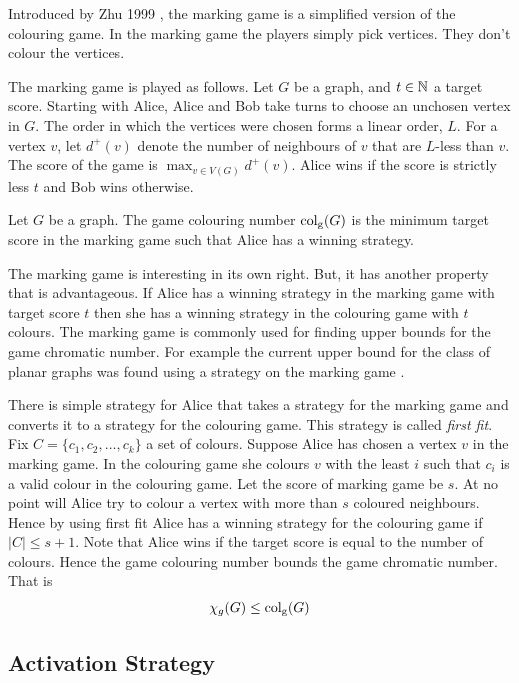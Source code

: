 Introduced by Zhu 1999 \cite{Zhu1999}, the marking game is a simplified version of the colouring game. In the marking game the players simply pick vertices. They don't colour the vertices. 

The marking game is played as follows. Let $G$ be a graph, and $t\in\mathbb{N}$ a target score. Starting with Alice, Alice and Bob take turns to choose an unchosen vertex in $G$. The order in which the vertices were chosen forms a linear order, $L$. For a vertex $v$, let $d^+(v)$ denote the number of neighbours of $v$ that are $L$-less than $v$. The score of the game is $\max_{v\in V(G)}d^+(v)$. Alice wins if the score is strictly less $t$ and Bob wins otherwise. 
%
\begin{definition}
    Let $G$ be a graph. The game colouring number $\operatorname{col_g}(G)$ is the minimum target score in the marking game such that Alice has a winning strategy. 
\end{definition}
%

The marking game is interesting in its own right. But, it has another property that is advantageous. If Alice has a winning strategy in the marking game with target score $t$ then she has a winning strategy in the colouring game with $t$ colours. The marking game is commonly used for finding upper bounds for the game chromatic number. For example the current upper bound for the class of planar graphs was found using a strategy on the marking game \cite{Zhu2008}.

There is simple strategy for Alice that takes a strategy for the marking game and converts it to a strategy for the colouring game. This strategy is called \textit{first fit}. Fix $C=\{c_1,c_2,\dots,c_k\}$ a set of colours. Suppose Alice has chosen a vertex $v$ in the marking game. In the colouring game she colours $v$ with the least $i$ such that $c_i$ is a valid colour in the colouring game. Let the score of marking game be $s$. At no point will Alice try to colour a vertex with more than $s$ coloured neighbours. Hence by using first fit Alice has a winning strategy for the colouring game if $|C|\leq s+1$. Note that Alice wins if the target score is equal to the number of colours. Hence the game colouring number bounds the game chromatic number. That is 
%
\[\chi_g(G)\leq\operatorname{col_g}(G)\]

\subsection{Activation Strategy}

